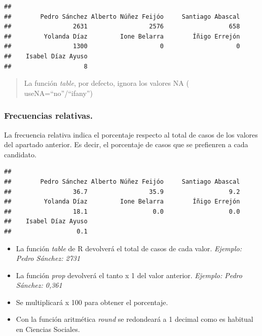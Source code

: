 \documentclass[
]{article}
\newenvironment{Shaded}{\begin{snugshade}}{\end{snugshade}}
\newcommand{\AttributeTok}[1]{\textcolor[rgb]{0.13,0.29,0.53}{#1}}
\newcommand{\DecValTok}[1]{\textcolor[rgb]{0.00,0.00,0.81}{#1}}
\newcommand{\FunctionTok}[1]{\textcolor[rgb]{0.13,0.29,0.53}{\textbf{#1}}}
\newcommand{\NormalTok}[1]{#1}
\newcommand{\SpecialCharTok}[1]{\textcolor[rgb]{0.81,0.36,0.00}{\textbf{#1}}}
\newcommand{\StringTok}[1]{\textcolor[rgb]{0.31,0.60,0.02}{#1}}
\providecommand{\tightlist}{%
  \setlength{\itemsep}{0pt}\setlength{\parskip}{0pt}}
\begin{document}
\begin{verbatim}
## 
##        Pedro Sánchez Alberto Núñez Feijóo     Santiago Abascal 
##                 2631                 2576                  658 
##         Yolanda Díaz         Ione Belarra        Íñigo Errejón 
##                 1300                    0                    0 
##    Isabel Díaz Ayuso 
##                    8
\end{verbatim}

\begin{quote}
La función \emph{table}, por defecto, ignora los valores NA (
useNA=``no''/``ifany'')
\end{quote}

\hypertarget{frecuencias-relativas.}{%
\subsubsection{Frecuencias relativas.}\label{frecuencias-relativas.}}

La frecuencia relativa indica el porcentaje respecto al total de casos
de los valores del apartado anterior. Es decir, el porcentaje de casos
que se prefienren a cada candidato.

\begin{Shaded}
\end{Shaded}

\begin{verbatim}
## 
##        Pedro Sánchez Alberto Núñez Feijóo     Santiago Abascal 
##                 36.7                 35.9                  9.2 
##         Yolanda Díaz         Ione Belarra        Íñigo Errejón 
##                 18.1                  0.0                  0.0 
##    Isabel Díaz Ayuso 
##                  0.1
\end{verbatim}

\begin{itemize}
\tightlist
\item
  La función \emph{table} de R devolverá el total de casos de cada
  valor. \emph{Ejemplo: Pedro Sánchez: 2731}
\item
  La función \emph{prop} devolverá el tanto x 1 del valor anterior.
  \emph{Ejemplo: Pedro Sánchez: 0,361}
\item
  Se multiplicará x 100 para obtener el porcentaje.
\item
  Con la función aritmética \emph{round} se redondeará a 1 decimal como
  es habitual en Ciencias Sociales.
\end{itemize}
\end{document}
